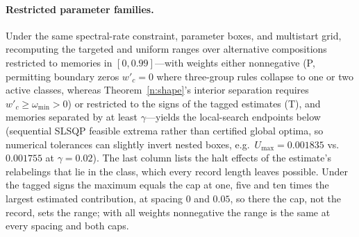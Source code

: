 \documentclass[12pt]{article}
\theoremstyle{definition}
\theoremstyle{remark}
\begin{document}
\paragraph{Restricted parameter families.} Under the same spectral-rate constraint, parameter boxes, and multistart grid, recomputing the targeted and uniform ranges over alternative compositions restricted to memories in $[0,0.99]$---with weights either nonnegative (P, permitting boundary zeros $w'_c = 0$ where three-group rules collapse to one or two active classes, whereas Theorem~\ref{n:shape}'s interior separation requires $w'_c \ge \omega_{\min} > 0$) or restricted to the signs of the tagged estimates (T), and memories separated by at least $\gamma$---yields the local-search endpoints below (sequential SLSQP feasible extrema rather than certified global optima, so numerical tolerances can slightly invert nested boxes, e.g.\ $U_{\max}=0.001835$ vs.\ $0.001755$ at $\gamma=0.02$). The last column lists the halt effects of the estimate's relabelings that lie in the class, which every record length leaves possible. Under the tagged signs the maximum equals the cap at one, five and ten times the largest estimated contribution, at spacing $0$ and $0.05$, so there the cap, not the record, sets the range; with all weights nonnegative the range is the same at every spacing and both caps.
\end{document}
